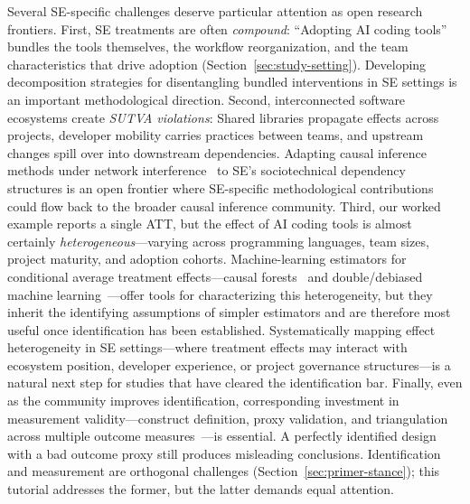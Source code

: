 Several SE-specific challenges deserve particular attention as open research frontiers.
First, SE treatments are often \emph{compound}: ``Adopting AI coding tools'' bundles the tools themselves, the workflow reorganization, and the team characteristics that drive adoption (Section~\ref{sec:study-setting}).
Developing decomposition strategies for disentangling bundled interventions in SE settings is an important methodological direction.
Second, interconnected software ecosystems create \emph{SUTVA violations}: Shared libraries propagate effects across projects, developer mobility carries practices between teams, and upstream changes spill over into downstream dependencies.
Adapting causal inference methods under network interference~\cite{savje2021average, forastiere2021identification} to SE's sociotechnical dependency structures is an open frontier where SE-specific methodological contributions could flow back to the broader causal inference community.
Third, our worked example reports a single ATT, but the effect of AI coding tools is almost certainly \emph{heterogeneous}---varying across programming languages, team sizes, project maturity, and adoption cohorts.
Machine-learning estimators for conditional average treatment effects---causal forests~\cite{wager2018estimation} and double/debiased machine learning~\cite{chernozhukov2018double}---offer tools for characterizing this heterogeneity, but they inherit the identifying assumptions of simpler estimators and are therefore most useful once identification has been established.
Systematically mapping effect heterogeneity in SE settings---where treatment effects may interact with ecosystem position, developer experience, or project governance structures---is a natural next step for studies that have cleared the identification bar.
Finally, even as the community improves identification, corresponding investment in measurement validity---construct definition, proxy validation, and triangulation across multiple outcome measures~\cite{lawlor2016triangulation}---is essential.
A perfectly identified design with a bad outcome proxy still produces misleading conclusions.
Identification and measurement are orthogonal challenges (Section~\ref{sec:primer-stance}); this tutorial addresses the former, but the latter demands equal attention.
